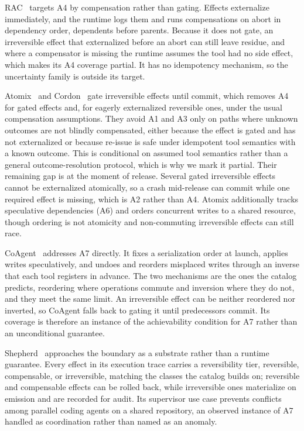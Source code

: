 \documentclass[runningheads]{comsis3}
\begin{document}
RAC~\cite{perera2026rac} targets A4 by compensation rather than gating.
Effects externalize immediately, and the runtime logs them and runs
compensations on abort in dependency order, dependents before parents.
Because it does not gate, an irreversible effect that externalized before
an abort can still leave residue, and where a compensator is missing the
runtime assumes the tool had no side effect, which makes its A4 coverage
partial. It has no idempotency mechanism, so the uncertainty family is
outside its target.

Atomix~\cite{mohammadi2026atomix} and Cordon~\cite{chen2026cordon} gate
irreversible effects until commit, which removes A4 for gated effects and,
for eagerly externalized reversible ones, under the usual compensation
assumptions. They avoid A1 and A3 only on paths where unknown outcomes are
not blindly compensated, either because the effect is gated and has not
externalized or because re-issue is safe under idempotent tool semantics
with a known outcome. This is conditional on assumed tool semantics rather
than a general outcome-resolution protocol, which is why we mark it
partial. Their remaining gap is at the moment of release. Several gated
irreversible effects cannot be externalized atomically, so a crash
mid-release can commit while one required effect is missing, which is A2
rather than A4. Atomix additionally tracks speculative dependencies (A6)
and orders concurrent writes to a shared resource, though ordering is not
atomicity and non-commuting irreversible effects can still race.

CoAgent~\cite{lyu2026coagent} addresses A7 directly. It fixes a
serialization order at launch, applies writes speculatively, and undoes and
reorders misplaced writes through an inverse that each tool registers in
advance. The two mechanisms are the ones the catalog predicts, reordering
where operations commute and inversion where they do not, and they meet the
same limit. An irreversible effect can be neither reordered nor inverted,
so CoAgent falls back to gating it until predecessors commit. Its coverage
is therefore an instance of the achievability condition for A7 rather than
an unconditional guarantee.

Shepherd~\cite{yu2026shepherd} approaches the boundary as a substrate
rather than a runtime guarantee. Every effect in its execution trace
carries a reversibility tier, reversible, compensable, or irreversible,
matching the classes the catalog builds on; reversible and compensable
effects can be rolled back, while irreversible ones materialize on emission
and are recorded for audit. Its supervisor use case prevents conflicts
among parallel coding agents on a shared repository, an observed instance
of A7 handled as coordination rather than named as an anomaly.
\end{document}
